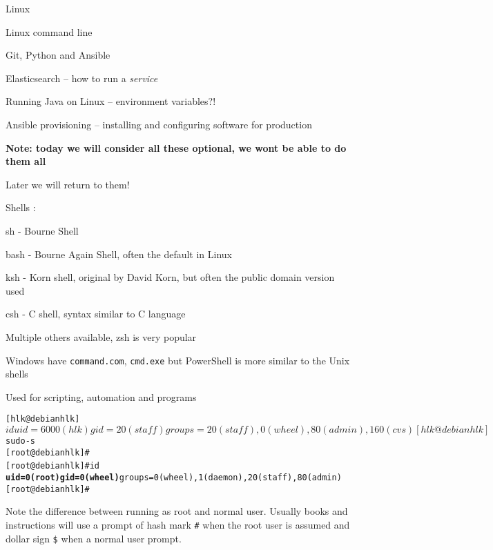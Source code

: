 \documentclass[Screen16to9,17pt]{foils}
\begin{document}
\begin{list2}
\item Linux
\item Linux command line
\item Git, Python and Ansible
\item Elasticsearch -- how to run a \emph{service}
\item Running Java on Linux -- environment variables?!
\item Ansible provisioning -- installing and configuring software for production
\end{list2}

{\bf Note: today we will consider all these optional, we wont be able to do them all}

Later we will return to them!


\begin{list1}
\item Shells :
  \begin{list2}
    \item sh - Bourne Shell
\item bash - Bourne Again Shell, often the default in Linux
\item ksh - Korn shell, original by David Korn, but often the public domain version used
\item csh - C shell, syntax similar to C language
\item Multiple others available, zsh is very popular
  \end{list2}
\item Windows have \verb+command.com+, \verb+cmd.exe+ but PowerShell is more similar to the Unix shells
\item Used for scripting, automation and programs
\end{list1}




\begin{alltt}
[hlk@debian hlk]$ id
uid=6000(hlk) gid=20(staff) groups=20(staff), 0(wheel), 80(admin), 160(cvs)
[hlk@debian hlk]$ sudo -s
[root@debian hlk]#
[root@debian hlk]# id {\bf
uid=0(root) gid=0(wheel)} groups=0(wheel), 1(daemon), 20(staff), 80(admin)
[root@debian hlk]#
\end{alltt}

Note the difference between running as root and normal user. Usually books and instructions will use a prompt of hash mark \verb+#+ when the root user is assumed and dollar sign \verb+$+ when a normal user prompt.
\end{document}
